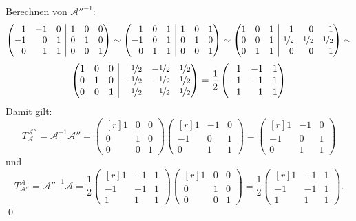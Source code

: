 \documentclass[answers]{exam}
\makeatletter
\newenvironment{sysmatrix}[1]
  {\left(\begin{array}{@{}#1@{}}}
  {\end{array}\right)}
\newcommand{\vektor}[1]{\begin{pmatrix*}[r] #1 \end{pmatrix*}}
\newcommand{\A}{\mathcal{A}}
\makeatother
\begin{document}
\begin{questions}
\begin{parts}
\begin{solution}
            Berechnen von $\A''^{-1}$:
            $$
                \begin{sysmatrix}{rrr|rrr}
                    1 & -1 & 0 & 1 & 0 & 0 \\
                    -1 & 0 & 1 & 0 & 1 & 0 \\
                    0 & 1 & 1 & 0 & 0 & 1
                \end{sysmatrix}
                \sim
                \begin{sysmatrix}{rrr|rrr}
                    1 & 0 & 1 & 1 & 0 & 1 \\
                    -1 & 0 & 1 & 0 & 1 & 0 \\
                    0 & 1 & 1 & 0 & 0 & 1
                \end{sysmatrix}
                \sim
                \begin{sysmatrix}{rrr|rrr}
                    1 & 0 & 1 & 1 & 0 & 1 \\
                    0 & 0 & 1 & \nicefrac{1}{2} & \nicefrac{1}{2} & \nicefrac{1}{2} \\
                    0 & 1 & 1 & 0 & 0 & 1
                \end{sysmatrix}
                \sim
            $$
            $$
                \begin{sysmatrix}{rrr|rrr}
                    1 & 0 & 0 & \nicefrac{1}{2} & -\nicefrac{1}{2} & \nicefrac{1}{2} \\
                    0 & 1 & 0 & -\nicefrac{1}{2} & -\nicefrac{1}{2} & \nicefrac{1}{2}\\
                    0 & 0 & 1 & \nicefrac{1}{2} & \nicefrac{1}{2} & \nicefrac{1}{2}
                \end{sysmatrix}
                =
                \frac{1}{2}\vektor{1 & -1 & 1 \\ -1 & -1 & 1 \\ 1 & 1 & 1}
            $$
            Damit gilt:
            $$
                T^{\A''}_{\A} = \A^{-1}\A'' = \vektor{1 & 0 & 0 \\ 0 & 1 & 0 \\ 0 & 0 & 1} \vektor{1 & -1 & 0 \\ -1 & 0 & 1 \\ 0 & 1 & 1} = \vektor{1 & -1 & 0 \\ -1 & 0 & 1 \\ 0 & 1 & 1}
            $$
            und
            $$
                T^{\A}_{\A''} = \A''^{-1}\A = \frac{1}{2}\vektor{1 & -1 & 1 \\ -1 & -1 & 1 \\ 1 & 1 & 1} \vektor{1 & 0 & 0 \\ 0 & 1 & 0 \\ 0 & 0 & 1} = \frac{1}{2}\vektor{1 & -1 & 1 \\ -1 & -1 & 1 \\ 1 & 1 & 1}.
            $$\qed
        \end{solution}

\end{parts}
\end{questions}
\end{document}
